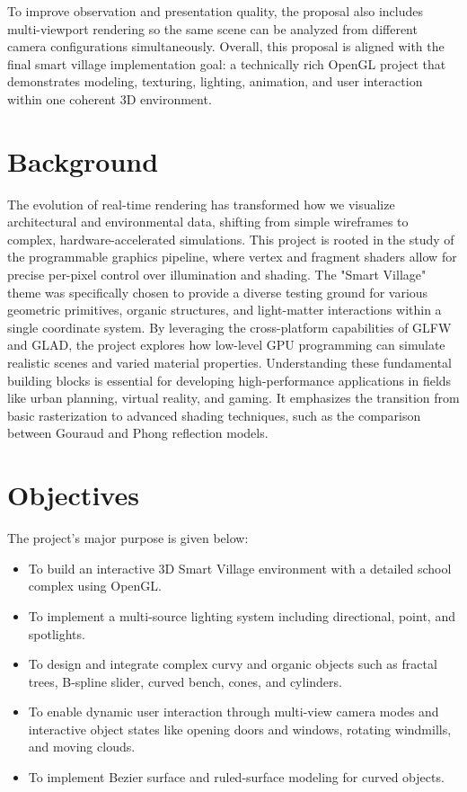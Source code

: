 \documentclass[12pt,a4paper]{report}
\begin{document}
To improve observation and presentation quality, the proposal also includes multi-viewport rendering so the same scene can be analyzed from different camera configurations simultaneously. Overall, this proposal is aligned with the final smart village implementation goal: a technically rich OpenGL project that demonstrates modeling, texturing, lighting, animation, and user interaction within one coherent 3D environment.

\section{Background}
The evolution of real-time rendering has transformed how we visualize architectural and environmental data, shifting from simple wireframes to complex, hardware-accelerated simulations. This project is rooted in the study of the programmable graphics pipeline, where vertex and fragment shaders allow for precise per-pixel control over illumination and shading. The "Smart Village" theme was specifically chosen to provide a diverse testing ground for various geometric primitives, organic structures, and light-matter interactions within a single coordinate system. By leveraging the cross-platform capabilities of GLFW and GLAD, the project explores how low-level GPU programming can simulate realistic scenes and varied material properties. Understanding these fundamental building blocks is essential for developing high-performance applications in fields like urban planning, virtual reality, and gaming. It emphasizes the transition from basic rasterization to advanced shading techniques, such as the comparison between Gouraud and Phong reflection models.

\section{Objectives}
The project's major purpose is given below:
\begin{itemize}
    \item To build an interactive 3D Smart Village environment with a detailed school complex using OpenGL.
    \item To implement a multi-source lighting system including directional, point, and spotlights.
    \item To design and integrate complex curvy and organic objects such as fractal trees, B-spline slider, curved bench, cones, and cylinders.
    \item To enable dynamic user interaction through multi-view camera modes and interactive object states like opening doors and windows, rotating windmills, and moving clouds.
    \item To implement Bezier surface and ruled-surface modeling for curved objects.
\end{itemize}
\end{document}
